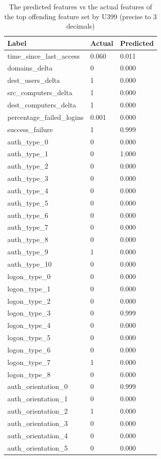 \begin{table}[htbp]
	\centering
	\caption{The predicted features vs the actual features of the top offending feature set by U399 (precise to 3 decimals)}\label{tab:predicted_vs_actual_top}
	\begin{tabular}{lll}
		Label & Actual & Predicted \\ \midrule
		time\_since\_last\_access & 0.060 & 0.011 \\
		domains\_delta & 0 & 0.000 \\
		dest\_users\_delta & 1 & 0.000 \\
		src\_computers\_delta & 1 & 0.000 \\
		dest\_computers\_delta & 1 & 0.000 \\
		percentage\_failed\_logins & 0.001 & 0.000 \\
		success\_failure & 1 & 0.999 \\
		auth\_type\_0 & 0 & 0.000 \\
		auth\_type\_1 & 0 & 1.000 \\
		auth\_type\_2 & 0 & 0.000 \\
		auth\_type\_3 & 0 & 0.000 \\
		auth\_type\_4 & 0 & 0.000 \\
		auth\_type\_5 & 0 & 0.000 \\
		auth\_type\_6 & 0 & 0.000 \\
		auth\_type\_7 & 0 & 0.000 \\
		auth\_type\_8 & 0 & 0.000 \\
		auth\_type\_9 & 1 & 0.000 \\
		auth\_type\_10 & 0 & 0.000 \\
		logon\_type\_0 & 0 & 0.000 \\
		logon\_type\_1 & 0 & 0.000 \\
		logon\_type\_2 & 0 & 0.000 \\
		logon\_type\_3 & 0 & 0.999 \\
		logon\_type\_4 & 0 & 0.000 \\
		logon\_type\_5 & 0 & 0.000 \\
		logon\_type\_6 & 0 & 0.000 \\
		logon\_type\_7 & 1 & 0.000 \\
		logon\_type\_8 & 0 & 0.000 \\
		auth\_orientation\_0 & 0 & 0.999 \\
		auth\_orientation\_1 & 0 & 0.000 \\
		auth\_orientation\_2 & 1 & 0.000 \\
		auth\_orientation\_3 & 0 & 0.000 \\
		auth\_orientation\_4 & 0 & 0.000 \\
		auth\_orientation\_5 & 0 & 0.000
	\end{tabular}
\end{table}


